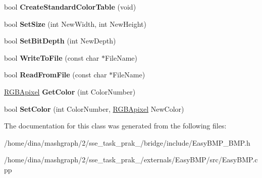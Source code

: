 \begin{DoxyCompactItemize}
\item 
\hypertarget{class_b_m_p_a10f253e8dabe8ee5f4c1825579a985d3}{bool {\bfseries Create\-Standard\-Color\-Table} (void)}\label{class_b_m_p_a10f253e8dabe8ee5f4c1825579a985d3}

\item 
\hypertarget{class_b_m_p_a2508215650ae9b72ab85d7b7e336378e}{bool {\bfseries Set\-Size} (int New\-Width, int New\-Height)}\label{class_b_m_p_a2508215650ae9b72ab85d7b7e336378e}

\item 
\hypertarget{class_b_m_p_a8274e16938a5ae0a71210f140e2fc016}{bool {\bfseries Set\-Bit\-Depth} (int New\-Depth)}\label{class_b_m_p_a8274e16938a5ae0a71210f140e2fc016}

\item 
\hypertarget{class_b_m_p_abb9f9f6a073c1eb9dfcc3799a25d15ab}{bool {\bfseries Write\-To\-File} (const char $\ast$File\-Name)}\label{class_b_m_p_abb9f9f6a073c1eb9dfcc3799a25d15ab}

\item 
\hypertarget{class_b_m_p_ae396a195224d9ab9f4659d4d84683cc2}{bool {\bfseries Read\-From\-File} (const char $\ast$File\-Name)}\label{class_b_m_p_ae396a195224d9ab9f4659d4d84683cc2}

\item 
\hypertarget{class_b_m_p_a3bad05db381bfcb97abb8d385f43097f}{\hyperlink{struct_r_g_b_apixel}{R\-G\-B\-Apixel} {\bfseries Get\-Color} (int Color\-Number)}\label{class_b_m_p_a3bad05db381bfcb97abb8d385f43097f}

\item 
\hypertarget{class_b_m_p_aa1b4400834341da1e6551f52a32b3956}{bool {\bfseries Set\-Color} (int Color\-Number, \hyperlink{struct_r_g_b_apixel}{R\-G\-B\-Apixel} New\-Color)}\label{class_b_m_p_aa1b4400834341da1e6551f52a32b3956}

\end{DoxyCompactItemize}


The documentation for this class was generated from the following files\-:\begin{DoxyCompactItemize}
\item 
/home/dina/mashgraph/2/sse\-\_\-task\-\_\-prak\-\_/bridge/include/Easy\-B\-M\-P\-\_\-\-B\-M\-P.\-h\item 
/home/dina/mashgraph/2/sse\-\_\-task\-\_\-prak\-\_/externals/\-Easy\-B\-M\-P/src/Easy\-B\-M\-P.\-cpp\end{DoxyCompactItemize}
